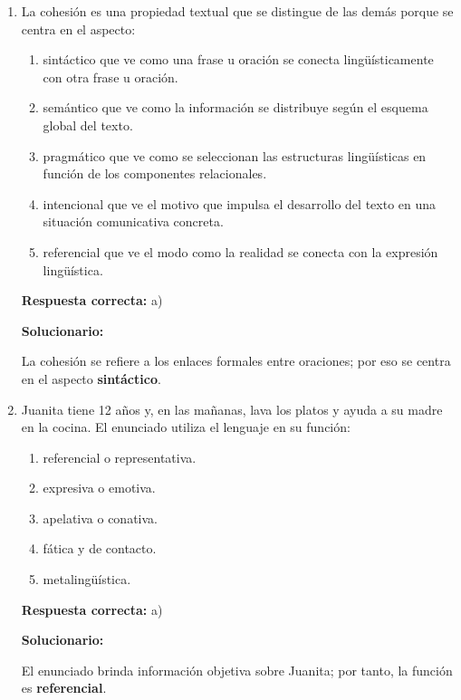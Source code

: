 \begin{enumerate}[resume]
	\item La cohesión es una propiedad textual que se distingue de las demás porque se centra en el aspecto:
	\begin{enumerate}[label=\alph*)]
		\item sintáctico que ve como una frase u oración se conecta lingüísticamente con otra frase u oración.
		\item semántico que ve como la información se distribuye según el esquema global del texto.
		\item pragmático que ve como se seleccionan las estructuras lingüísticas en función de los componentes relacionales.
		\item intencional que ve el motivo que impulsa el desarrollo del texto en una situación comunicativa concreta.
		\item referencial que ve el modo como la realidad se conecta con la expresión lingüística.
	\end{enumerate}
	\textbf{Respuesta correcta:} a)
	
	\vspace{2mm}
	\textbf{Solucionario:}
	
	La cohesión se refiere a los enlaces formales entre oraciones; por eso se centra en el aspecto \textbf{sintáctico}.
	
	\vspace{6mm}
	
	\item Juanita tiene 12 años y, en las mañanas, lava los platos y ayuda a su madre en la cocina. El enunciado utiliza el lenguaje en su función:
	\begin{enumerate}[label=\alph*)]
		\item referencial o representativa.
		\item expresiva o emotiva.
		\item apelativa o conativa.
		\item fática y de contacto.
		\item metalingüística.
	\end{enumerate}
	\textbf{Respuesta correcta:} a)
	
	\vspace{2mm}
	\textbf{Solucionario:}
	
	El enunciado brinda información objetiva sobre Juanita; por tanto, la función es \textbf{referencial}.
	
	\vspace{6mm}
	
\end{enumerate}


